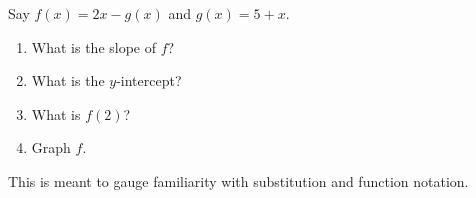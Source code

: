 \documentclass[noauthor]{ximera}
\begin{document}
\begin{problem}
Say \(f(x) = 2x - g(x)\) and \(g(x) = 5 + x\).

\begin{enumerate}
    \item What is the slope of \(f\)?
    \item What is the \(y\)-intercept?
    \item What is \(f(2)\)?
    \item Graph \(f\).
\end{enumerate}

\begin{instructorNotes}
This is meant to gauge familiarity with substitution and function notation.
\end{instructorNotes}
\end{problem}
\end{document}
